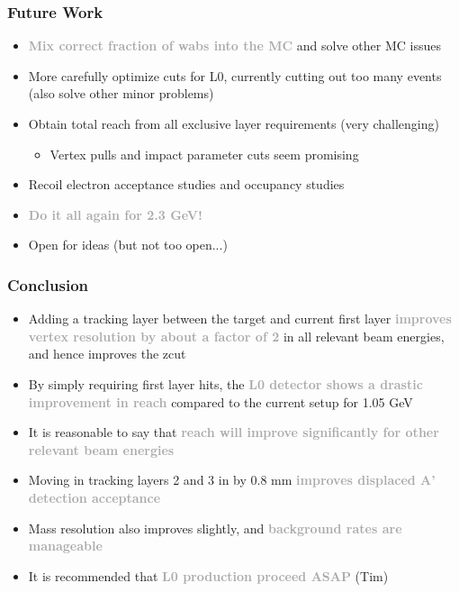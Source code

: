\documentclass{beamer}
\begin{document}


\begin{frame}
\frametitle{Future Work}
\begin{itemize}
\item \textcolor{darkgray}{\textbf{Mix correct fraction of wabs into the MC}} and solve other MC issues
\item More carefully optimize cuts for L0, currently cutting out too many events (also solve other minor problems)
\item Obtain total reach from all exclusive layer requirements (very challenging)
\begin{itemize}
\item Vertex pulls and impact parameter cuts seem promising
\end{itemize}
\item Recoil electron acceptance studies and occupancy studies
\item \textcolor{darkgray}{\textbf{Do it all again for 2.3 GeV!}}
\item Open for ideas (but not too open...)
\end{itemize}

\end{frame}


\begin{frame}
\frametitle{Conclusion}
\begin{itemize}
\item Adding a tracking layer between the target and current first layer \textcolor{darkgray}{\textbf{improves vertex resolution by about a factor of 2}} in all relevant beam energies, and hence improves the zcut
\item By simply requiring first layer hits, the \textcolor{darkgray}{\textbf{L0 detector shows a drastic improvement in reach}} compared to the current setup for 1.05 GeV
\item It is reasonable to say that \textcolor{darkgray}{\textbf{reach will improve significantly for other relevant beam energies}}
\item Moving in tracking layers 2 and 3 in by 0.8 mm \textcolor{darkgray}{\textbf{improves displaced A' detection acceptance}}
\item Mass resolution also improves slightly, and \textcolor{darkgray}{\textbf{background rates are manageable}}
\item It is recommended that \textcolor{darkgray}{\textbf{L0 production proceed ASAP}} (Tim)
\end{itemize}

\end{frame}
\end{document}
